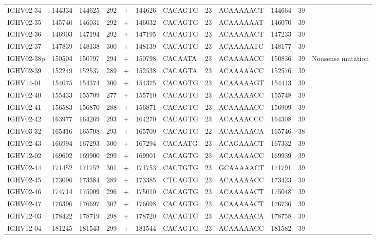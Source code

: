 \begin{tabular}{lrrrlrlllrrl}
  IGHV02-34 & 144334 & 144625 & 292 & + & 144626 & CACAGTG & 23 & ACAAAAACT & 144664 & 39 &  \\ 
  IGHV02-35 & 145740 & 146031 & 292 & + & 146032 & CACAGTG & 23 & ACAAAAAAT & 146070 & 39 &  \\ 
  IGHV02-36 & 146903 & 147194 & 292 & + & 147195 & CACAGTG & 23 & ACAAAAACT & 147233 & 39 &  \\ 
  IGHV02-37 & 147839 & 148138 & 300 & + & 148139 & CACAGTG & 23 & ACAAAAATC & 148177 & 39 &  \\ 
  IGHV02-38p & 150504 & 150797 & 294 & + & 150798 & CACAATA & 23 & ACAAAAACC & 150836 & 39 & Nonsense mutation \\ 
  IGHV02-39 & 152249 & 152537 & 289 & + & 152538 & CACAGTA & 23 & ACAAAAACC & 152576 & 39 &  \\ 
  IGHV14-01 & 154075 & 154374 & 300 & + & 154375 & CACAGTG & 23 & ACAAAAAGT & 154413 & 39 &  \\ 
  IGHV02-40 & 155433 & 155709 & 277 & + & 155710 & CACAGTG & 23 & ACAAAAACC & 155748 & 39 &  \\ 
  IGHV02-41 & 156583 & 156870 & 288 & + & 156871 & CACAGTG & 23 & ACAAAAACC & 156909 & 39 &  \\ 
  IGHV02-42 & 163977 & 164269 & 293 & + & 164270 & CACAGTG & 23 & ACAAAACCC & 164308 & 39 &  \\ 
  IGHV03-32 & 165416 & 165708 & 293 & + & 165709 & CACAGTG & 22 & ACAAAAACA & 165746 & 38 &  \\ 
  IGHV02-43 & 166994 & 167293 & 300 & + & 167294 & CACAATG & 23 & ACAGAAACT & 167332 & 39 &  \\ 
  IGHV12-02 & 169602 & 169900 & 299 & + & 169901 & CACAGTG & 23 & ACAAAAACC & 169939 & 39 &  \\ 
  IGHV02-44 & 171452 & 171752 & 301 & + & 171753 & CACTGTG & 23 & GCAAAAACT & 171791 & 39 &  \\ 
  IGHV02-45 & 173096 & 173384 & 289 & + & 173385 & CTCAGTG & 23 & ACAAAAACC & 173423 & 39 &  \\ 
  IGHV02-46 & 174714 & 175009 & 296 & + & 175010 & CACAGTG & 23 & ACAAAAACT & 175048 & 39 &  \\ 
  IGHV02-47 & 176396 & 176697 & 302 & + & 176698 & CACAGTG & 23 & ACAAAAACT & 176736 & 39 &  \\ 
  IGHV12-03 & 178422 & 178719 & 298 & + & 178720 & CACAGTG & 23 & ACAAAAACA & 178758 & 39 &  \\ 
  IGHV12-04 & 181245 & 181543 & 299 & + & 181544 & CACAGTG & 23 & ACAAAAACC & 181582 & 39 &  \\ 

\end{tabular}
